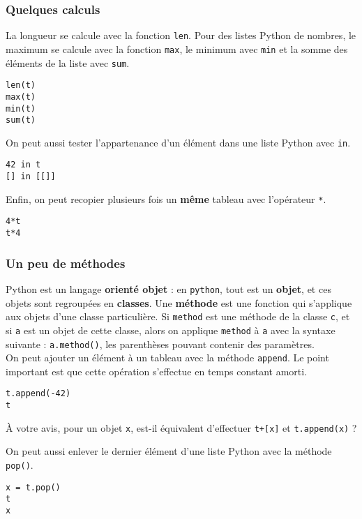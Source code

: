 \subsubsection{Quelques calculs}
La longueur se calcule avec la fonction \texttt{len}. Pour des listes Python de nombres, le maximum 
se calcule avec la fonction \texttt{max}, le minimum avec \texttt{min} et la somme des éléments de la 
liste avec \texttt{sum}.
\begin{lstlisting}
len(t)
max(t)
min(t)
sum(t)
\end{lstlisting}

On peut aussi tester l'appartenance d'un élément dans une liste Python avec \texttt{in}.

\begin{lstlisting}
42 in t
[] in [[]]
\end{lstlisting}

Enfin, on peut recopier plusieurs fois un \textbf{même} tableau avec l'opérateur \texttt{*}.

\begin{lstlisting}
4*t
t*4
\end{lstlisting}




\subsubsection{Un peu de méthodes}
Python est un langage \textbf{orienté objet} : en \texttt{python}, tout est un \textbf{objet}, et ces objets 
sont regroupées en \textbf{classes}. Une \textbf{méthode} est une fonction qui s'applique aux objets 
d'une classe particulière. Si \texttt{method} est une méthode de la classe \texttt{c}, et si 
\texttt{a} est un objet de cette classe, alors on applique \texttt{method} à \texttt{a} avec la 
syntaxe suivante : \texttt{a.method()}, les parenthèses pouvant contenir des paramètres.\\

On peut ajouter un élément à un tableau avec la méthode \texttt{append}. Le point important est que 
cette opération s'effectue en temps constant amorti.
\begin{lstlisting}
t.append(-42)
t
\end{lstlisting}
\`A votre avis, pour un objet \texttt{x}, est-il équivalent d'effectuer \texttt{t+[x]} et \texttt{t.append(x)} ?

On peut aussi enlever le dernier élément d'une liste Python avec la méthode \texttt{pop()}.
\begin{lstlisting}
x = t.pop()
t
x
\end{lstlisting}

